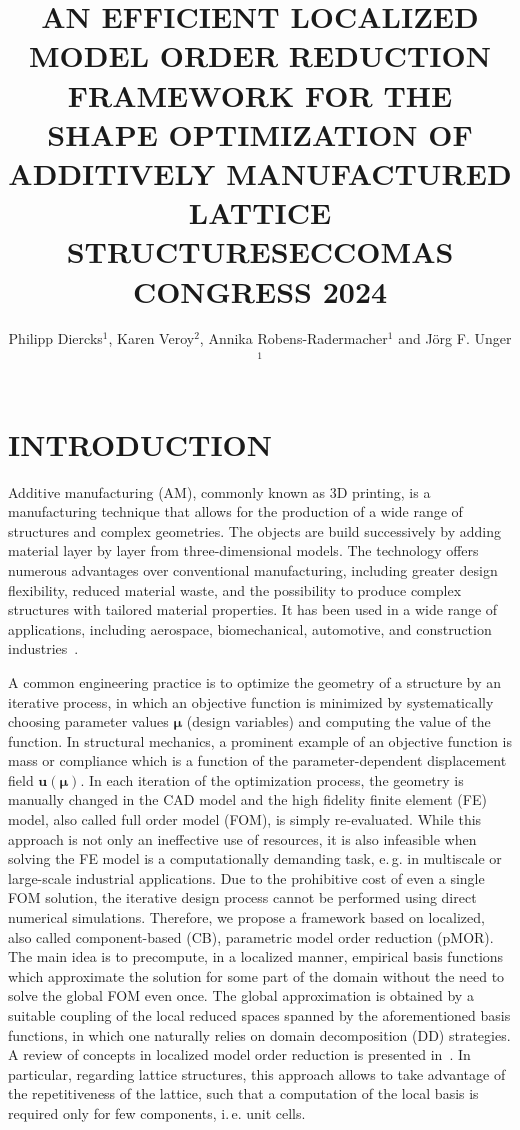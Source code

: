 \documentclass[a4paper]{eccomas_paper-2024}
\title{AN EFFICIENT LOCALIZED MODEL ORDER REDUCTION FRAMEWORK FOR THE SHAPE OPTIMIZATION OF ADDITIVELY MANUFACTURED LATTICE STRUCTURES\break ECCOMAS CONGRESS 2024}
\author{Philipp Diercks$^{1}$, Karen Veroy$^{2}$, Annika Robens-Radermacher$^{1}$ and Jörg F. Unger$^{1}$}
\makeatletter
\newcommand{\ie}{i.\,e.\@\xspace}
\newcommand{\eg}{e.\,g.\@\xspace}
\makeatother
\begin{document}
\thispagestyle{empty}

\section{INTRODUCTION}%
\label{sec:introduction}

Additive manufacturing (AM), commonly known as 3D printing, is a manufacturing technique that allows for the production of a wide range of structures and complex geometries.
The objects are build successively by adding material layer by layer from three-dimensional models.
The technology offers numerous advantages over conventional manufacturing, including greater design flexibility, reduced material waste, and the possibility to produce complex structures with tailored material properties.
It has been used in a wide range of applications, including aerospace, biomechanical, automotive, and construction industries~\cite{Plessis2022Properties,Wu2016critical}.

A common engineering practice is to optimize the geometry of a structure by an iterative process, in which an objective function is minimized by systematically choosing parameter values $\bm\mu$ (design variables) and computing the value of the function.
In structural mechanics, a prominent example of an objective function is mass or compliance which is a function of the parameter-dependent displacement field $\bm{u}(\bm\mu)$.
In each iteration of the optimization process, the geometry is manually changed in the CAD model and the high fidelity finite element (FE) model, also called full order model (FOM), is simply re-evaluated.
While this approach is not only an ineffective use of resources, it is also infeasible when solving the FE model is a computationally demanding task, \eg{} in multiscale or large-scale industrial applications.
Due to the prohibitive cost of even a single FOM solution, the iterative design process cannot be performed using direct numerical simulations.
Therefore, we propose a framework based on localized, also called component-based (CB), parametric model order reduction (pMOR).
The main idea is to precompute, in a localized manner, empirical basis functions which approximate the solution for some part of the domain without the need to solve the global FOM even once.
The global approximation is obtained by a suitable coupling of the local reduced spaces spanned by the aforementioned basis functions, in which one naturally relies on domain decomposition (DD) strategies.
A review of concepts in localized model order reduction is presented in~\cite{BuhrReview}.
In particular, regarding lattice structures, this approach allows to take advantage of the repetitiveness of the lattice, such that a computation of the local basis is required only for few components, \ie{} unit cells.
\end{document}
